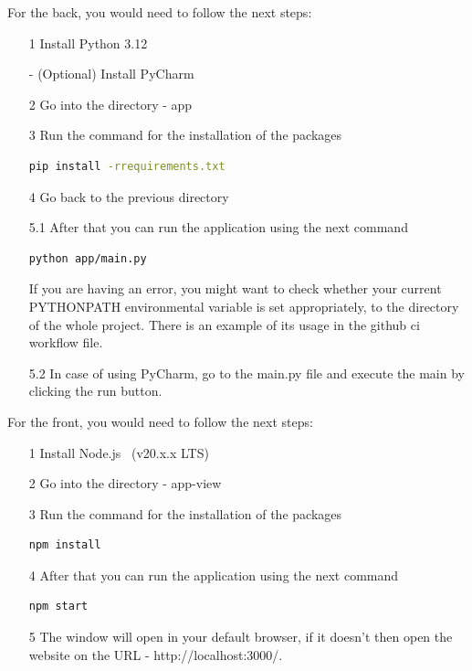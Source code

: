 For the back, you would need to follow the next steps:
\begin{itemize}
	\item[1] Install Python 3.12~\cite{python-download-web}
	\item[-] (Optional) Install PyCharm~\cite{pycharm-download-web}
	\item[2] Go into the directory - app
	\item[3] Run the command for the installation of the packages
	\begin{lstlisting}[language={bash}]
		pip install -rrequirements.txt
	\end{lstlisting}
	\item[4] Go back to the previous directory
	\item[5.1] After that you can run the application using the next command
	\begin{lstlisting}[language={bash}]
		python app/main.py
	\end{lstlisting}
	If you are having an error, you might want to check whether your current PYTHONPATH environmental variable is set appropriately, to the directory of the whole project. There is an example of its usage in the github ci workflow file.
	\item[5.2] In case of using PyCharm, go to the main.py file and execute the main by clicking the run button. 
\end{itemize}



For the front, you would need to follow the next steps:
\begin{itemize}
	\item[1] Install Node.js~\cite{nodejs-web} (v20.x.x LTS)
	\item[2] Go into the directory - app-view
	\item[3] Run the command for the installation of the packages
		\begin{lstlisting}[language={bash}]
			npm install
		\end{lstlisting}
	\item[4] After that you can run the application using the next command
		\begin{lstlisting}[language={bash}]
			npm start
		\end{lstlisting}
	\item[5] The window will open in your default browser, if it doesn't then open the website on the URL - http://localhost:3000/.
\end{itemize}

